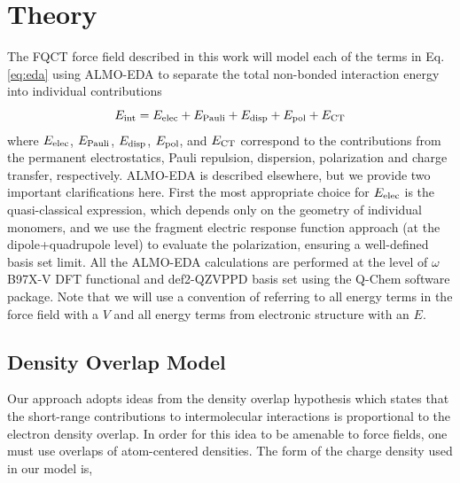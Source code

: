 \documentclass[journal=jctcce,manuscript=article]{achemso}
\begin{document}
\section*{Theory}
The FQCT force field described in this work will model each of the terms in Eq. \ref{eq:eda} using ALMO-EDA to separate the total non-bonded interaction energy into individual contributions\cite{khaliullin2007,horn2016probing}
\begin{equation}
E_{\rm int} = E_{\rm elec} + E_{\rm Pauli} + E_{\rm disp} + E_{\rm pol} +  E_{\rm CT}
 \label{eq:eda}
\end{equation}
where $E_{\rm elec}$, $E_{\rm Pauli}$, $ E_{\rm disp}$, $E_{\rm pol}$, and  $E_{\rm CT}$ correspond to the contributions from the permanent electrostatics, Pauli repulsion, dispersion, polarization and charge transfer, respectively.
ALMO-EDA is described elsewhere\cite{khaliullin2007,horn2016probing}, but we provide two important clarifications here. First the most appropriate choice for $E_{\rm elec}$ is the quasi-classical expression, which depends only on the geometry of individual monomers\cite{mao2017energy}, and we use the fragment electric response function approach (at the dipole+quadrupole level) to evaluate the  polarization, ensuring a well-defined basis set limit.\cite{horn2015} All the ALMO-EDA calculations are performed at the level of $\omega$B97X-V DFT functional\cite{Mardirossian2014} and def2-QZVPPD basis set\cite{Rappoport2010} using the Q-Chem software package\cite{Epifanovsky2021}. Note that we will use a convention of referring to all energy terms in the force field with a $V$ and all energy terms from electronic structure
with an $E$. 

\subsection*{Density Overlap Model}
Our approach adopts ideas from the density overlap hypothesis\cite{kim1981dependence,wheatley1990overlap,gavezzotti2002calculation,van2016beyond,van2018new}
which states that the short-range contributions to intermolecular interactions is proportional to the electron density overlap. In order for this idea to be amenable to force fields, one must use overlaps of atom-centered
densities. The form of the charge density used in our model is,
\end{document}

